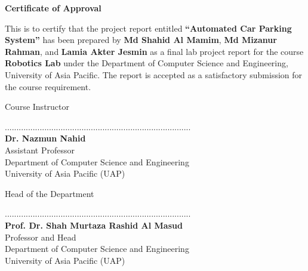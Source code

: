 
\newpage
\begin{center}

    \vspace*{0.1cm}
    \large
    \textbf{Certificate of Approval}\\
    \vspace{0.5cm}

\end{center}

\noindent
{\large This is to certify that the project report entitled \textbf{``Automated Car Parking System''} has been prepared by \textbf{Md Shahid Al Mamim}, \textbf{Md Mizanur Rahman}, and \textbf{Lamia Akter Jesmin} as a final lab project report for the course \textbf{Robotics Lab} under the Department of Computer Science and Engineering, University of Asia Pacific. The report is accepted as a satisfactory submission for the course requirement.}

\vspace{2cm}

\begin{flushright}
Course Instructor
\end{flushright}

\vspace{-2.3cm}

................................................................................\\
\textbf{Dr. Nazmun Nahid}\\
Assistant Professor\\
Department of Computer Science and Engineering\\
University of Asia Pacific (UAP)

\vspace{2.5cm}

\begin{flushright}
Head of the Department
\end{flushright}

\vspace{-2.3cm}

................................................................................\\
\textbf{Prof. Dr. Shah Murtaza Rashid Al Masud}\\
Professor and Head\\
Department of Computer Science and Engineering\\
University of Asia Pacific (UAP)

